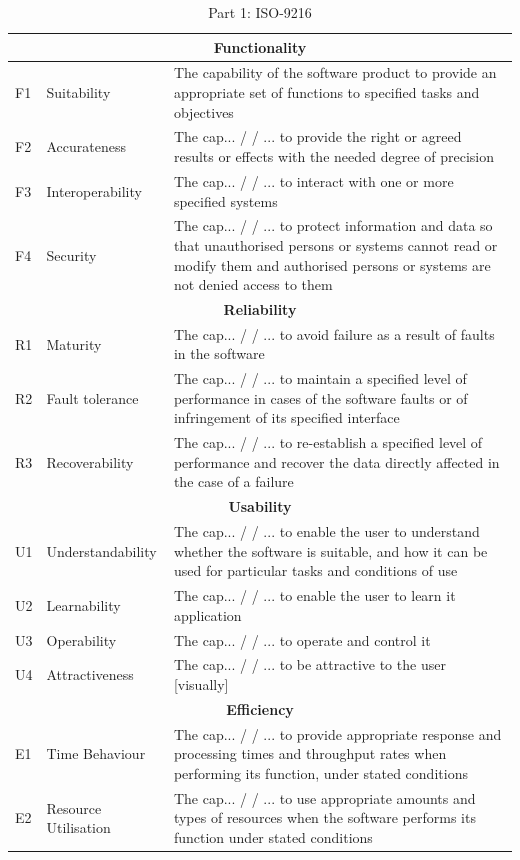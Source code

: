 \documentclass{article}
\begin{document}
\begin{table}[H]
\centering
\begin{tabularx}{\columnwidth}{|l|l|X|}
\hline

\multicolumn{3}{c}{\textbf{Functionality}} \\ \hline
F1  &   Suitability &The capability of the software product to provide an appropriate set of
functions to specified tasks and objectives \\ \hline
F2  &   Accurateness &  The cap... / / ... to provide the right or agreed results or effects with the needed
degree of precision \\ \hline
F3  &   Interoperability& The cap... / / ... to interact with one or more specified systems \\ \hline
F4  &   Security& The cap... / / ... to protect information and data so that unauthorised persons or systems
cannot read or modify them and authorised persons or systems are not denied access to them \\ \hline

\multicolumn{3}{c}{\textbf{Reliability}} \\ \hline
R1  & Maturity    & The cap... / / ... to avoid failure as a result of faults in the software \\
\hline
R2  &   Fault tolerance & The cap... / / ... to maintain a specified level of performance in cases of the
software faults or of infringement of its specified interface \\ \hline
R3  &   Recoverability  & The cap... / / ... to re-establish a specified level of performance and recover the
data directly affected in the case of a failure \\ \hline

\multicolumn{3}{c}{\textbf{Usability}} \\ \hline
U1  &   Understandability   &   The cap... / / ... to enable the user to understand whether the
software is suitable, and how it can be used for particular tasks and conditions of use \\ \hline
U2&Learnability & The cap... / / ... to enable the user to learn it application \\ \hline
U3&Operability & The cap... / / ... to operate and control it \\ \hline
U4&Attractiveness& The cap... / / ... to be attractive to the user [visually] \\ \hline

\multicolumn{3}{c}{\textbf{Efficiency}} \\ \hline
E1&Time Behaviour & The cap... / / ... to provide appropriate response and processing times and
throughput rates when performing its function, under stated conditions \\ \hline
E2&Resource Utilisation & The cap... / / ... to use appropriate amounts and types of resources when the software
performs its function under stated conditions \\ \hline
\end{tabularx}
\caption{Part 1: ISO-9216}
\label{tabl:standard1}
\end{table}
\end{document}
